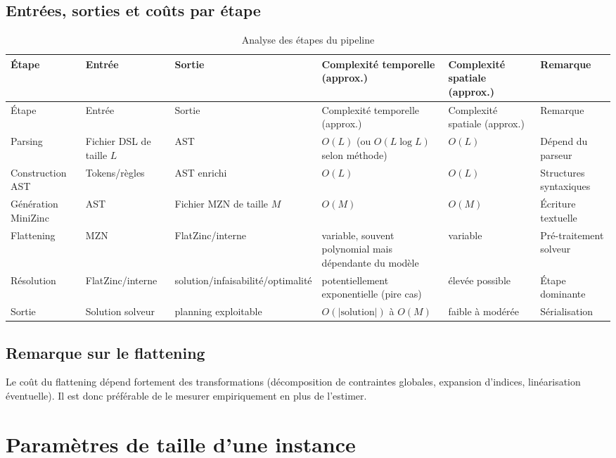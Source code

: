 \documentclass[12pt,a4paper]{article}
\begin{document}
\subsection{Entrées, sorties et coûts par étape}
\begin{longtable}{@{}p{2.4cm}p{2.3cm}p{2.4cm}p{3.2cm}p{3.2cm}p{2.0cm}@{}}
\caption{Analyse des étapes du pipeline}\label{tab:pipeline}\\
\toprule
Étape & Entrée & Sortie & Complexité temporelle (approx.) & Complexité spatiale (approx.) & Remarque \\
\midrule
\endfirsthead
\toprule
Étape & Entrée & Sortie & Complexité temporelle (approx.) & Complexité spatiale (approx.) & Remarque \\
\midrule
\endhead
Parsing & Fichier DSL de taille $L$ & AST & $O(L)$ (ou $O(L\log L)$ selon méthode) & $O(L)$ & Dépend du parseur \\
Construction AST & Tokens/règles & AST enrichi & $O(L)$ & $O(L)$ & Structures syntaxiques \\
Génération MiniZinc & AST & Fichier MZN de taille $M$ & $O(M)$ & $O(M)$ & Écriture textuelle \\
Flattening & MZN & FlatZinc/interne & variable, souvent polynomial mais dépendante du modèle & variable & Pré-traitement solveur \\
Résolution & FlatZinc/interne & solution/infaisabilité/optimalité & potentiellement exponentielle (pire cas) & élevée possible & Étape dominante \\
Sortie & Solution solveur & planning exploitable & $O(|\text{solution}|)$ à $O(M)$ & faible à modérée & Sérialisation \\
\bottomrule
\end{longtable}

\subsection{Remarque sur le flattening}
Le coût du flattening dépend fortement des transformations (décomposition de contraintes globales, expansion d'indices, linéarisation éventuelle). Il est donc préférable de le mesurer empiriquement en plus de l'estimer.

\section{Paramètres de taille d'une instance}
\end{document}
